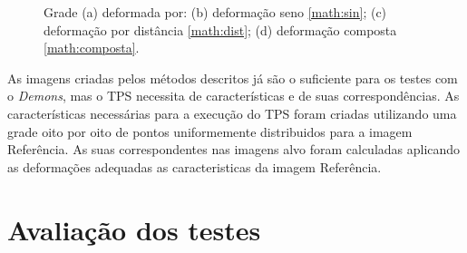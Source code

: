 \begin{figure}[H]
\begin{subfigure}[t]{0.3\textwidth}
	  \label{fig:dist-image}
	\end{subfigure}
	\caption{Grade (a) deformada por: (b) deformação seno \ref{math:sin}; (c) deformação por distância \ref{math:dist}; 
				(d) deformação composta \ref{math:composta}. }
	\label{fig:deformacoes}
\end{figure}

	As imagens criadas pelos métodos descritos já são o suficiente para os testes com o \textit{Demons}, mas o TPS
necessita de características e de suas correspondências. As características necessárias para a execução do TPS foram 
criadas utilizando uma grade oito por oito de pontos uniformemente distribuidos para a imagem Referência. As suas 
correspondentes nas imagens alvo foram calculadas aplicando as deformações adequadas as caracteristicas da imagem 
Referência.

\section{Avaliação dos testes}

